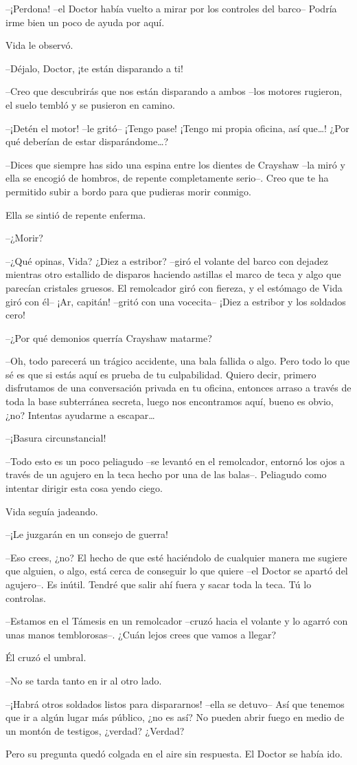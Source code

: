 {--¡Perdona! --el Doctor había vuelto a mirar por los controles del
barco-- Podría irme bien un poco de ayuda por aquí.}

{Vida le observó.}

{--Déjalo, Doctor, ¡te están disparando a ti!}

{--Creo que descubrirás que nos están disparando a ambos --los motores
rugieron, el suelo tembló y se pusieron en camino.}

{--¡Detén el motor! --le gritó-- ¡Tengo pase! ¡Tengo mi propia oficina,
 así que\ldots{}! ¿Por qué deberían de estar disparándome\ldots{}?}

{--Dices que siempre has sido una espina entre los dientes de Crayshaw
 --la miró y ella se encogió de hombros, de repente completamente
 serio--. Creo que te ha permitido subir a bordo para que pudieras morir
conmigo.}

{Ella se sintió de repente enferma.}

{--¿Morir?}

{--¿Qué opinas, Vida? ¿Diez a estribor? --giró el volante del barco con
 dejadez mientras otro estallido de disparos haciendo astillas el marco
 de teca y algo que parecían cristales gruesos. El remolcador giró con
 fiereza, y el estómago de Vida giró con él-- ¡Ar, capitán! --gritó con
una vocecita-- ¡Diez a estribor y los soldados cero!}

{--¿Por qué demonios querría Crayshaw matarme?}

{--Oh, todo parecerá un trágico accidente, una bala fallida o algo. Pero
 todo lo que sé es que si estás aquí es prueba de tu culpabilidad. Quiero
 decir, primero disfrutamos de una conversación privada en tu oficina,
 entonces arraso a través de toda la base subterránea secreta, luego nos
 encontramos aquí, bueno es obvio, ¿no? Intentas ayudarme a
 escapar\ldots{}}

{--¡Basura circunstancial!}

{--Todo esto es un poco peliagudo --se levantó en el remolcador, entornó
 los ojos a través de un agujero en la teca hecho por una de las balas--.
Peliagudo como intentar dirigir esta cosa yendo ciego.}

{Vida seguía jadeando.}

{--¡Le juzgarán en un consejo de guerra!}

{--Eso crees, ¿no? El hecho de que esté haciéndolo de cualquier manera
 me sugiere que alguien, o algo, está cerca de conseguir lo que quiere
 --el Doctor se apartó del agujero--. Es inútil. Tendré que salir ahí
fuera y sacar toda la teca. Tú lo controlas.}

{--Estamos en el Támesis en un remolcador --cruzó hacia el volante y lo
 agarró con unas manos temblorosas--. ¿Cuán lejos crees que vamos a
llegar?}

{Él cruzó el umbral.}

{--No se tarda tanto en ir al otro lado.}

{--¡Habrá otros soldados listos para dispararnos! --ella se detuvo-- Así
 que tenemos que ir a algún lugar más público, ¿no es así? No pueden
abrir fuego en medio de un montón de testigos, ¿verdad? ¿Verdad?}

{Pero su pregunta quedó colgada en el aire sin respuesta. El Doctor se
había ido.}
